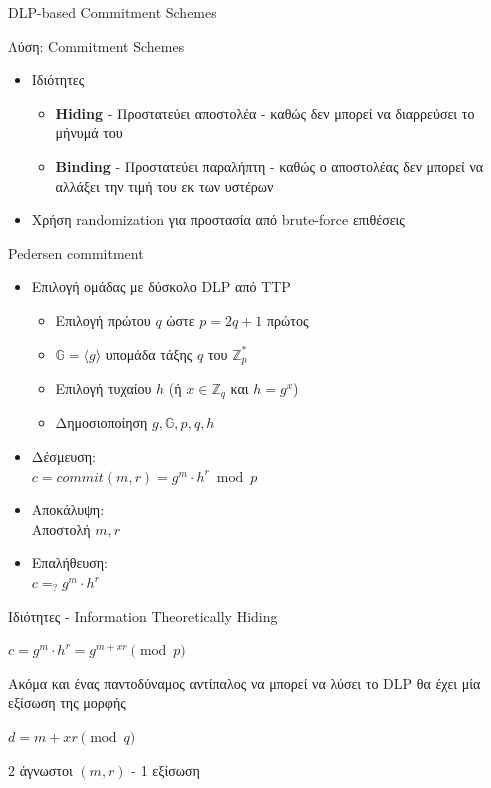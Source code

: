 \documentclass[handout]{beamer}
\begin{document}
\begin{frame}{DLP-based Commitment Schemes}
\begin{block}{Λύση:  Commitment Schemes}
\begin{itemize}
\item Ιδιότητες
\pause
\begin{itemize}
\item \textbf{Hiding} - Προστατεύει αποστολέα -  καθώς δεν μπορεί να διαρρεύσει το μήνυμά του
\pause
\item \textbf{Binding} - Προστατεύει παραλήπτη -  καθώς ο αποστολέας δεν μπορεί να αλλάξει την τιμή του εκ των υστέρων
\pause
\end{itemize}
\item Χρήση randomization για προστασία από brute-force επιθέσεις
\end{itemize}
\end{block}
\end{frame}

\begin{frame}{Pedersen commitment}
\begin{itemize}
\item  Επιλογή ομάδας με δύσκολο DLP από TTP
\begin{itemize}
\item Επιλογή πρώτου $q$ ώστε $p=2q+1$ πρώτος
\item $\mathbb{G}=\langle g \rangle$ υπομάδα τάξης $q$ του $\mathbb{Z}_p^*$
\item Επιλογή τυχαίου $h$ (ή $x \in \mathbb{Z}_q$ και $h=g^x$)
\item Δημοσιοποίηση $g,\mathbb{G},p,q,h$
\end{itemize}
\pause
\item Δέσμευση: \\ $c=commit(m,r) = g^m \cdot h^r \bmod{p}$
\pause
\item Αποκάλυψη: \\ Αποστολή $m,r$
\pause
\item Επαλήθευση: \\ $c =_? g^m \cdot h^r$
\end{itemize}
\end{frame}

\begin{frame}{Ιδιότητες - Information Theoretically Hiding}

$c = g^m \cdot h^r =g^{m+xr} \pmod{p}$ \pause

Ακόμα και ένας παντοδύναμος αντίπαλος να μπορεί να λύσει το DLP θα έχει μία εξίσωση της μορφής

$d = m+xr \pmod{q}$ \pause

2 άγνωστοι $(m,r)$ - 1 εξίσωση
\end{frame}
\end{document}
